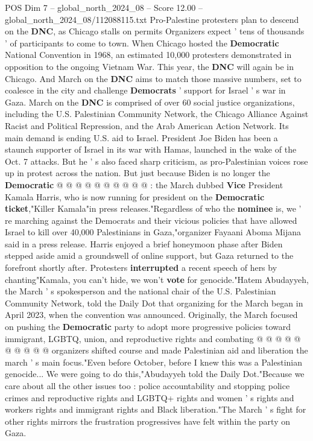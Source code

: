 \begin{textsample}{POS Dim 7 – global\_north\_2024\_08 – Score 12.00 – global\_north\_2024\_08/112088115.txt}  \label{ex:f7_pos_014}
Pro-Palestine protesters plan to descend on the \textbf{DNC}, as Chicago stalls on permits Organizers expect ' tens of thousands ' of participants to come to town.
When Chicago hosted the \textbf{Democratic} National Convention in 1968, an estimated 10,000 protesters demonstrated in opposition to the ongoing Vietnam War.
This year, the \textbf{DNC} will again be in Chicago.
And March on the \textbf{DNC} aims to match those massive numbers, set to coalesce in the city and challenge \textbf{Democrats} ' support for Israel ' s war in Gaza.
March on the \textbf{DNC} is comprised of over 60 social justice organizations, including the U.S.
Palestinian Community Network, the Chicago Alliance Against Racist and Political Repression, and the Arab American Action Network.
Its main demand is ending U.S. aid to Israel.
President Joe Biden has been a staunch supporter of Israel in its war with Hamas, launched in the wake of the Oct. 7 attacks.
But he ' s also faced sharp criticism, as pro-Palestinian voices rose up in protest across the nation.
But just because Biden is no longer the \textbf{Democratic} @ @ @ @ @ @ @ @ @ @ : the March dubbed \textbf{Vice} President Kamala Harris, who is now running for president on the \textbf{Democratic} \textbf{ticket},"Killer Kamala"in press releases."Regardless of who the \textbf{nominee} is, we ' re marching against the Democrats and their vicious policies that have allowed Israel to kill over 40,000 Palestinians in Gaza,"organizer Fayaani Aboma Mijana said in a press release.
Harris enjoyed a brief honeymoon phase after Biden stepped aside amid a groundswell of online support, but Gaza returned to the forefront shortly after.
Protesters \textbf{interrupted} a recent speech of hers by chanting"Kamala, you can't hide, we won't \textbf{vote} for genocide."Hatem Abudayyeh, the March ' s spokesperson and the national chair of the U.S.
Palestinian Community Network, told the Daily Dot that organizing for the March began in April 2023, when the convention was announced.
Originally, the March focused on pushing the \textbf{Democratic} party to adopt more progressive policies toward immigrant, LGBTQ, union, and reproductive rights and combating @ @ @ @ @ @ @ @ @ @ organizers shifted course and made Palestinian aid and liberation the march ' s main focus."Even before October, before I knew this was a Palestinian genocide...
We were going to do this,"Abudayyeh told the Daily Dot."Because we care about all the other issues too : police accountability and stopping police crimes and reproductive rights and LGBTQ+ rights and women ' s rights and workers rights and immigrant rights and Black liberation."The March ' s fight for other rights mirrors the frustration progressives have felt within the party on Gaza.

\end{textsample}
